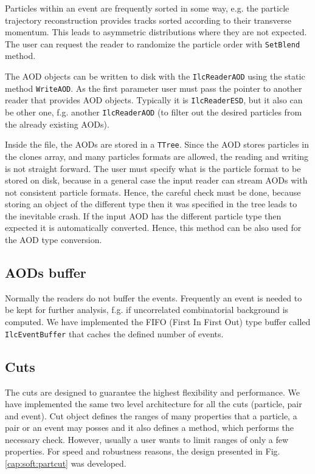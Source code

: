 \documentclass[12pt,a4paper,twoside]{article}
\begin{document}
{%
Particles within an event are frequently sorted in some way, e.g.
the particle trajectory reconstruction provides tracks sorted according
to their transverse momentum. This leads to asymmetric 
distributions where they are not expected. The user can request the
reader to randomize the particle order with \texttt{SetBlend} method.

The AOD objects can be written to disk with the \texttt{IlcReaderAOD}
using the static method \texttt{WriteAOD}. As the first
parameter user must pass the pointer to another reader that 
provides AOD objects. Typically it is \texttt{IlcReaderESD},
but it also can be other one, f.g. another \texttt{IlcReaderAOD} 
(to filter out the desired particles from the already existing AODs).

Inside the file, the AODs are stored in a \texttt{TTree}.
Since the AOD stores particles in the clones array, and many particles
formats are allowed, the reading and writing is not straight forward.
The user must specify what is the particle format to be stored on disk,
because in a general case the input reader can stream AODs with not consistent
particle formats. Hence, the careful check must be done, because storing 
an object of the different type then it was specified in the tree leads
to the inevitable crash. If the input AOD has the different particle type then
expected it is automatically converted. Hence, this method can be also used
for the AOD type conversion.


\subsection{AODs buffer}

Normally the readers do not buffer the events. 
Frequently an event is needed to be kept for further analysis, 
f.g. if uncorrelated combinatorial background is computed. 
We have implemented the FIFO (First In First Out) type buffer called
\texttt{IlcEventBuffer} that caches the defined number of events.


\subsection{Cuts}

The cuts are designed to guarantee the highest flexibility 
and performance. We have implemented the same two level architecture 
for all the cuts (particle, pair and event). 
Cut object defines the ranges of many properties that a particle, a pair or 
an event may posses and it also defines a method, which performs the
necessary check. However, usually a user wants to limit
ranges of only a few properties. For speed and robustness reasons, 
the design presented in Fig.\ref{cap:soft:partcut} was developed.

}
\end{document}
